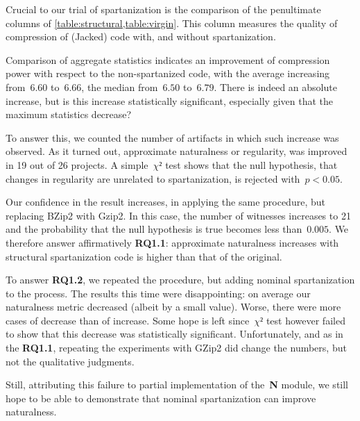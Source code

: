 Crucial to our trial of spartanization is the comparison of the penultimate
columns of \cref{table:structural,table:virgin}.
This column measures the quality of compression of (Jacked) code
with, and without spartanization.

Comparison of aggregate statistics indicates an improvement of compression
power with respect to the non-spartanized code, with the average increasing
from~$6.60$ to~$6.66$, the median from~$6.50$ to~$6.79$. There is indeed an
absolute increase, but is this increase statistically significant, especially
given that the maximum statistics decrease?

To answer this, we counted the number of artifacts in which such increase was
observed. As it turned out, approximate naturalness or regularity, was improved
in 19 out of 26 projects. A simple~$χ²$ test shows that the null hypothesis,
that changes in regularity are unrelated to spartanization, is rejected
with~$p < 0.05$.

Our confidence in the result increases, in applying the same procedure, but
replacing BZip2 with Gzip2. In this case, the number of witnesses increases to
21 and the probability that the null hypothesis is true becomes less
than~$0.005$. We therefore answer affirmatively \textbf{RQ1.1}: approximate
naturalness increases with structural spartanization code is higher than that
of the original.

To answer \textbf{RQ1.2}, we repeated the procedure, but adding nominal
spartanization to the process. The results this time were disappointing:
on average our naturalness metric decreased (albeit by a small value).
Worse, there were more cases of decrease than of increase. Some hope is left
since~$χ²$ test however failed to show that this decrease was statistically
significant. Unfortunately, and as in the \textbf{RQ1.1}, repeating the
experiments with GZip2 did change the numbers, but not the qualitative
judgments.

Still, attributing this failure to partial implementation of the~\textbf{N}
module, we still hope to be able to demonstrate that nominal spartanization can
improve naturalness.
\endinput

The first column of \cref{table:comparisons-original} refers to the application
of the Jack algorithm to the spartanized code. As we can see some of these
values are negative - particularly average, max value and range.  A negative
value for the average of the Jack compression powers implies that, on average,
spartanized code is less prone to be compressed by Jack the original code.
Negative values for max compression and range, that are of course related values, means
that there is a significant difference, for some projects, in the degree of compression
that Jack might achieved on spartanized code.

